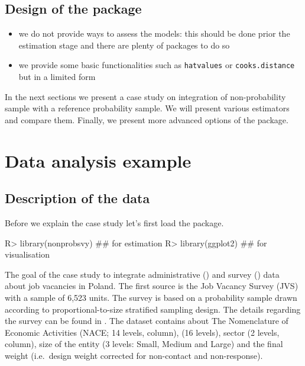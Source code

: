 \documentclass[
]{jss}
\providecommand{\tightlist}{%
  \setlength{\itemsep}{0pt}\setlength{\parskip}{0pt}}
\begin{document}
\subsection{Design of the package}\label{design-of-the-package}

\begin{itemize}
\tightlist
\item
  we do not provide ways to assess the models: this should be done prior
  the estimation stage and there are plenty of packages to do so
\item
  we provide some basic functionalities such as \texttt{hatvalues} or
  \texttt{cooks.distance} but in a limited form
\end{itemize}

In the next sections we present a case study on integration of
non-probability sample with a reference probability sample. We will
present various estimators and compare them. Finally, we present more
advanced options of the package.

\section{Data analysis example}\label{sec-data-analysis}

\subsection{Description of the data}\label{description-of-the-data}

Before we explain the case study let's first load the package.

\begin{CodeChunk}
\begin{CodeInput}
R> library(nonprobsvy) ## for estimation
R> library(ggplot2) ## for visualisation
\end{CodeInput}
\end{CodeChunk}

The goal of the case study to integrate administrative ()
and survey () data about job vacancies in Poland. The first
source is the Job Vacancy Survey (JVS) with a sample of 6,523 units. The
survey is based on a probability sample drawn according to
proportional-to-size stratified sampling design. The details regarding
the survey can be found in \cite{jvs2022}. The dataset contains about
The Nomenclature of Economic Activities (NACE; 14 levels, 
column),  (16 levels), sector (2 levels, 
column), size of the entity (3 levels: Small, Medium and Large) and the
final weight (i.e.~design weight corrected for non-contact and
non-response).
\end{document}

